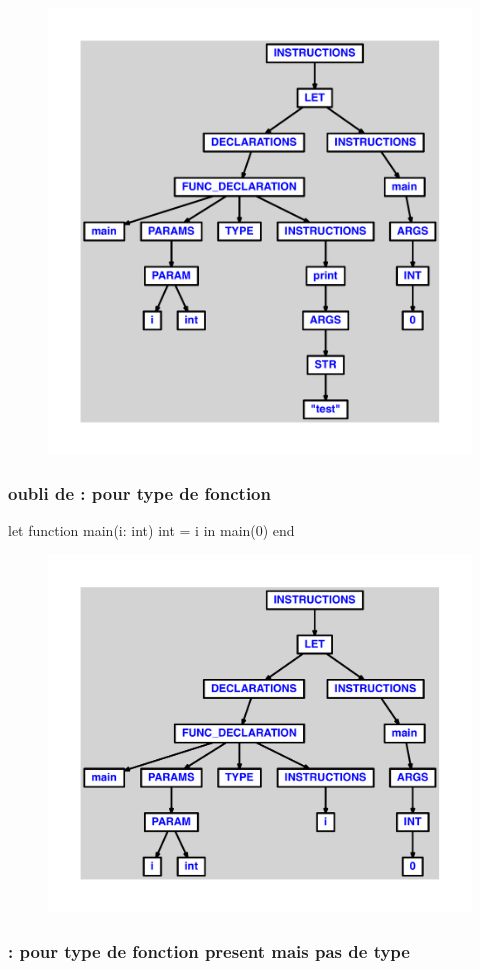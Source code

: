 \documentclass{article}
\begin{document}
\begin{figure}[H]\centering\includegraphics[max width=\textwidth]{ast/ast_211.pdf}\end{figure}\subsubsection{oubli de : pour type de fonction}
\begin{verbatimtab}
let
	function main(i: int) int = i
in main(0) end
\end{verbatimtab}
\begin{figure}[H]\centering\includegraphics[max width=\textwidth]{ast/ast_212.pdf}\end{figure}\subsubsection{: pour type de fonction present mais pas de type}
\end{document}
